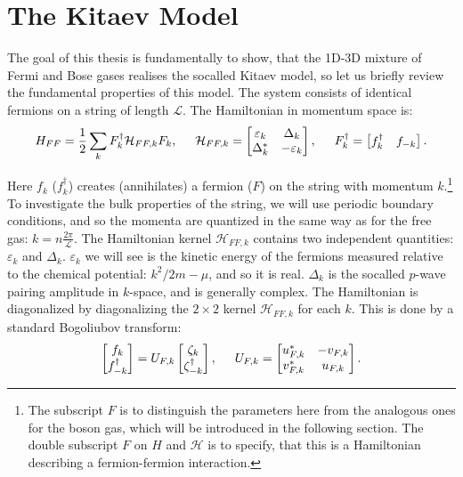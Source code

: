\section{The Kitaev Model}
The goal of this thesis is fundamentally to show, that the 1D-3D mixture of Fermi and Bose gases realises the socalled Kitaev model, so let us briefly review the fundamental properties of this model. The system consists of identical fermions on a string of length $\mathcal{L}$. The Hamiltonian in momentum space is: 
\begin{equation}
H_{FF} = \frac{1}{2}\sum_{k} F_k^\dagger \mathcal{H}_{FF,k} F_k, \hspace{0.5cm} \mathcal{H}_{FF,k} = \begin{bmatrix} \varepsilon_k & \Delta_k \\ \Delta^*_k & -\varepsilon_k \end{bmatrix}, \hspace{0.5cm} F^\dagger_k = \begin{bmatrix} f_k^\dagger & f_{-k} \end{bmatrix}. 
\label{eq.HKitaevpre}
\end{equation}

Here $f_k$ ($f_k^\dagger$) creates (annihilates) a fermion ($F$) on the string with momentum $k$.\footnote{The subscript $F$ is to distinguish the parameters here from the analogous ones for the boson gas, which will be introduced in the following section. The double subscript $F$ on $H$ and $\mathcal{H}$ is to specify, that this is a Hamiltonian describing a fermion-fermion interaction.} To investigate the bulk properties of the string, we will use periodic boundary conditions, and so the momenta are quantized in the same way as for the free gas: $k = n\frac{2\pi}{\mathcal{L}}$. The Hamiltonian kernel $\mathcal{H}_{FF,k}$ contains two independent quantities: $\varepsilon_k$ and $\Delta_k$. $\varepsilon_k$ we will see is the kinetic energy of the fermions measured relative to the chemical potential: $k^2/2m-\mu$, and so it is real. $\Delta_k$ is the socalled $p$-wave pairing amplitude in $k$-space, and is generally complex. The Hamiltonian is diagonalized by diagonalizing the $2\times 2$ kernel $\mathcal{H}_{FF,k}$ for each $k$. This is done by a standard Bogoliubov transform: 
\begin{equation}
 \begin{bmatrix} f_k \\ f_{-k}^\dagger \end{bmatrix} = U_{F,k} \begin{bmatrix} \zeta_k \\ \zeta^\dagger_{-k} \end{bmatrix}, \hspace{0.5cm} U_{F,k} = \begin{bmatrix} u^*_{F,k} & -v_{F,k} \\ v^*_{F,k} & u_{F,k} \end{bmatrix}. 
 \label{eq.fermionquasiparticledef}
\end{equation}

